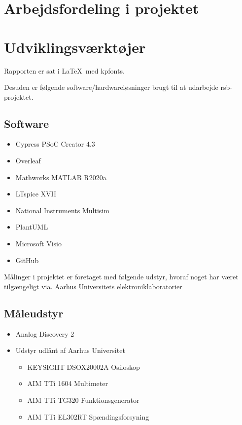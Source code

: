 \section{Arbejdsfordeling i projektet}



\section{Udviklingsværktøjer}
Rapporten er sat i \LaTeX~med kpfonts.

Desuden er følgende software/hardwareløsninger brugt til at udarbejde \gls{rsb}-projektet.

\subsection{Software}
\begin{itemize}
    \item Cypress PSoC Creator 4.3
    \item Overleaf
    \item Mathworks MATLAB R2020a
    \item LTspice XVII
    \item National Instruments Multisim
    \item PlantUML
    \item Microsoft Visio
    \item GitHub
\end{itemize}

Målinger i projektet er foretaget med følgende udstyr, hvoraf noget har været tilgængeligt via. Aarhus Universitets elektroniklaboratorier
\subsection{Måleudstyr}
\begin{itemize}
    \item Analog Discovery 2
    \item Udstyr udlånt af Aarhus Universitet
          \begin{itemize}
              \item KEYSIGHT DSOX20002A Osiloskop
              \item AIM TTi 1604 Multimeter
              \item AIM TTi TG320 Funktionsgenerator
              \item AIM TTi EL302RT Spændingsforsyning
          \end{itemize}
\end{itemize}